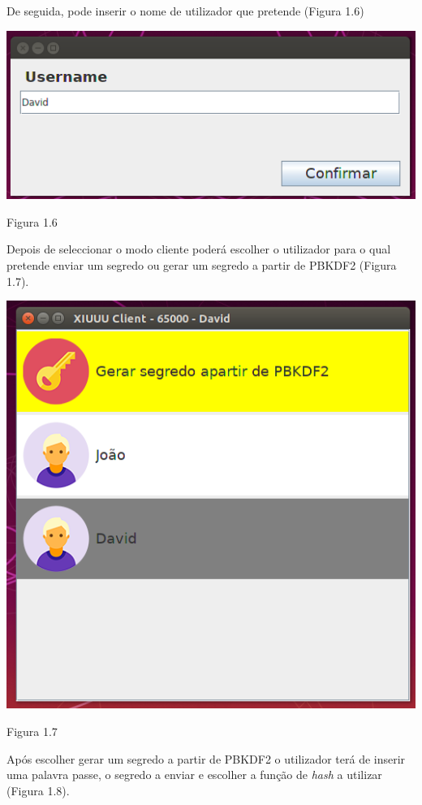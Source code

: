 De seguida, pode inserir o nome de utilizador que pretende (Figura 1.6)
\newline\begin{center}\includegraphics[scale=0.5]{img/insertUsername.png}\newline\caption{Figura 1.6}\end{center}
Depois de seleccionar o modo cliente  poderá escolher o utilizador para o qual pretende enviar um segredo ou gerar um segredo a partir de PBKDF2 (Figura 1.7).
\newline\begin{center}\includegraphics[scale=0.5]{img/clientInterface.png}\newline\caption{Figura 1.7}\end{center}
Após escolher gerar um segredo a partir de PBKDF2 o utilizador terá de inserir uma palavra passe, o segredo a enviar e escolher a função de \textit{hash} a utilizar (Figura 1.8).

